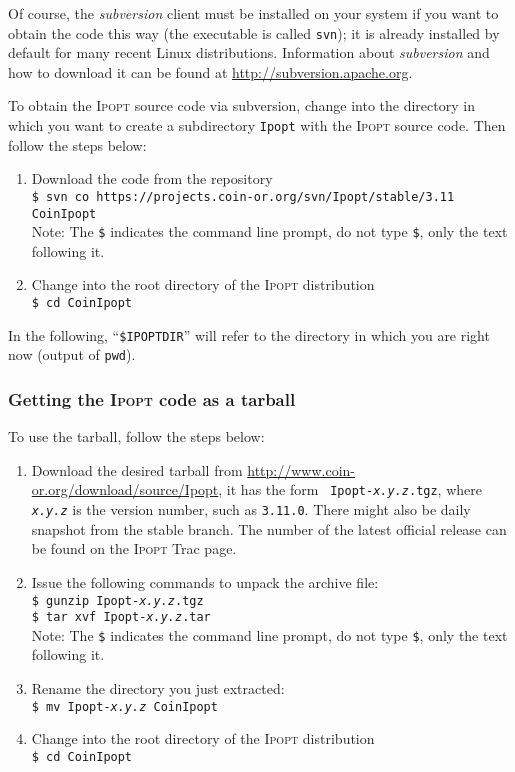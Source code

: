 \documentclass[10pt]{article}
\newcommand{\Ipopt}{\textsc{Ipopt}\xspace}
\begin{document}
Of course, the \textit{subversion} client must be installed on your
system if you want to obtain the code this way (the executable is
called \texttt{svn}); it is already installed by default for many
recent Linux distributions.  Information about \textit{subversion} and
how to download it can be found at
\url{http://subversion.apache.org}.

To obtain the \Ipopt source code via subversion, change into the
directory in which you want to create a subdirectory {\tt Ipopt} with
the \Ipopt source code.  Then follow the steps below:
\begin{enumerate}
\item{Download the code from the repository}\\
{\tt \$ svn co https://projects.coin-or.org/svn/Ipopt/stable/3.11 CoinIpopt} \\
Note: The {\tt \$} indicates the command line
prompt, do not type {\tt \$}, only the text following it.
\item Change into the root directory of the \Ipopt distribution\\
{\tt \$ cd CoinIpopt}
\end{enumerate}

In the following, ``\texttt{\$IPOPTDIR}'' will refer to the directory in
which you are right now (output of \texttt{pwd}).

\subsubsection{Getting the \Ipopt code as a tarball}

To use the tarball, follow the steps below:
\begin{enumerate}
\item Download the desired tarball from
  \url{http://www.coin-or.org/download/source/Ipopt}, it has the form {\tt
    Ipopt-{\em x.y.z}.tgz}, where {\tt\em x.y.z} is the version
  number, such as {\tt 3.11.0}.  There might also be daily snapshot
  from the stable branch.  The number of the latest official release
  can be found on the \Ipopt Trac page.
\item Issue the following commands to unpack the archive file: \\
\texttt{\$ gunzip Ipopt-{\em x.y.z}.tgz} \\
\texttt{\$ tar xvf Ipopt-{\em x.y.z}.tar} \\
Note: The {\tt \$} indicates the command line
prompt, do not type {\tt \$}, only the text following it.
\item Rename the directory you just extracted:\\
\texttt{\$ mv Ipopt-{\em x.y.z} CoinIpopt}
\item Change into the root directory of the \Ipopt distribution\\
{\tt \$ cd CoinIpopt}
\end{enumerate}
\end{document}
